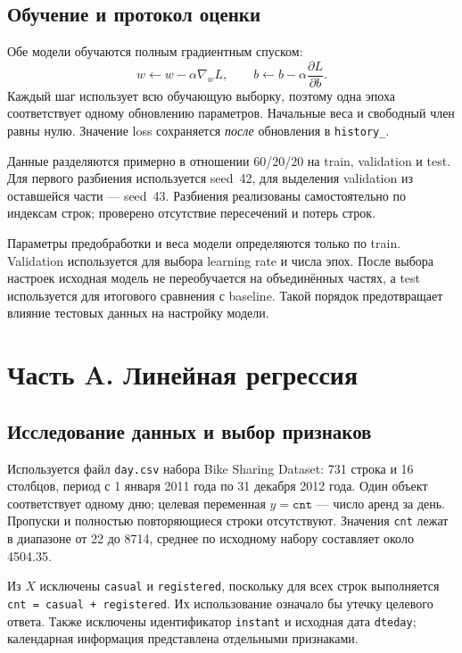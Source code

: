 \documentclass[a4paper,12pt]{article}
\newcommand{\code}[1]{\texttt{#1}}
\begin{document}
\subsection{Обучение и протокол оценки}

Обе модели обучаются полным градиентным спуском:
\begin{equation}
    w\leftarrow w-\alpha\nabla_w L,
    \qquad b\leftarrow b-\alpha\frac{\partial L}{\partial b}.
\end{equation}
Каждый шаг использует всю обучающую выборку, поэтому одна эпоха соответствует
одному обновлению параметров. Начальные веса и свободный член равны нулю.
Значение loss сохраняется \emph{после} обновления в \code{history\_}.

Данные разделяются примерно в отношении 60/20/20 на train, validation и test.
Для первого разбиения используется seed~42, для выделения validation
из оставшейся части --- seed~43. Разбиения реализованы самостоятельно
по индексам строк; проверено отсутствие пересечений и потерь строк.

Параметры предобработки и веса модели определяются только по train.
Validation используется для выбора learning rate и числа эпох.
После выбора настроек исходная модель не переобучается на объединённых
частях, а test используется для итогового сравнения с baseline.
Такой порядок предотвращает влияние тестовых данных на настройку модели.

\section{Часть A. Линейная регрессия}

\subsection{Исследование данных и выбор признаков}

Используется файл \code{day.csv} набора Bike Sharing Dataset:
731 строка и 16 столбцов, период с 1 января 2011 года по 31 декабря 2012 года.
Один объект соответствует одному дню; целевая переменная
$y=\code{cnt}$ --- число аренд за день. Пропуски и полностью
повторяющиеся строки отсутствуют. Значения \code{cnt} лежат в диапазоне
от 22 до 8714, среднее по исходному набору составляет около 4504.35.

Из $X$ исключены \code{casual} и \code{registered}, поскольку для всех строк
выполняется \code{cnt = casual + registered}. Их использование означало бы
утечку целевого ответа. Также исключены идентификатор \code{instant}
и исходная дата \code{dteday}; календарная информация представлена
отдельными признаками.
\end{document}
